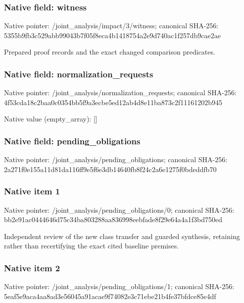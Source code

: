 \documentclass[10pt,a4paper]{article}
\begin{document}
\subsubsection{Native field: witness}
Native pointer: /joint\_\allowbreak{}analysis/impact/3/witness; canonical SHA-256: 5355b9fb3c529abb99043b7f05f8eca4b1418754a2e9d740ac1f257db9cae2ae

\begingroup\raggedright\sloppy Prepared proof records and the exact changed comparison predicates.\par\endgroup

\subsubsection{Native field: normalization\_\allowbreak{}requests}
Native pointer: /joint\_\allowbreak{}analysis/normalization\_\allowbreak{}requests; canonical SHA-256: 4f53cda18c2baa0c0354bb5f9a3ecbe5ed12ab4d8e11ba873c2f11161202b945

Native value (empty\_\allowbreak{}array): []

\subsubsection{Native field: pending\_\allowbreak{}obligations}
Native pointer: /joint\_\allowbreak{}analysis/pending\_\allowbreak{}obligations; canonical SHA-256: 2a271f0e155a11d81da116ff9e5f6e3db14640fb8f24c2a6e1275f0bdeddfb70

\subsubsection{Native item 1}
Native pointer: /joint\_\allowbreak{}analysis/pending\_\allowbreak{}obligations/0; canonical SHA-256: bb2e91ac0444646d75c34ba803288aa836998eebfade8f29e64a4a1f3bd750ed

\begingroup\raggedright\sloppy Independent review of the new class transfer and guarded synthesis,\allowbreak{} retaining rather than recertifying the exact cited baseline premises.\par\endgroup

\subsubsection{Native item 2}
Native pointer: /joint\_\allowbreak{}analysis/pending\_\allowbreak{}obligations/1; canonical SHA-256: 5eaf5e9aca4aa8ad3e56045a91acae9f74082e3c71ebe21b4fe37bfdce85e4df
\end{document}
